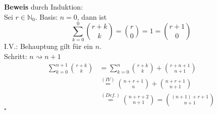 \documentclass[11pt,a4paper,ngerman]{article}
\begin{document}
\textbf{Beweis} durch Induktion: \\
Sei $r \in \mathbb{N}_0$.
Basis: $n = 0$, dann ist
    \begin{equation*}
      \sum_{k=0}^0 \binom{r+k}{k} = \binom{r}{0} = 1 = \binom{r+1}{0}
    \end{equation*}
I.V.: Behauptung gilt für ein $n$. \\
Schritt: $n \rightsquigarrow n+1$
    \begin{equation*}\begin{split}
      \sum_{k=0}^{n+1} \binom{r+k}{k} &= \sum_{k=0}^{n} \binom{r+k}{k} + \binom{r+n+1}{n+1} \\
      &\stackrel{(IV)}{=}\binom{n+r+1}{n} + \binom{n+r+1}{n+1}  \\
      &\stackrel{(Def.)}{=}\binom{n+r+2}{n+1} = \binom{(n+1)+r+1}{n+1}
    \end{split}\end{equation*}
\mbox{} \hfill $\square$
\end{document}
